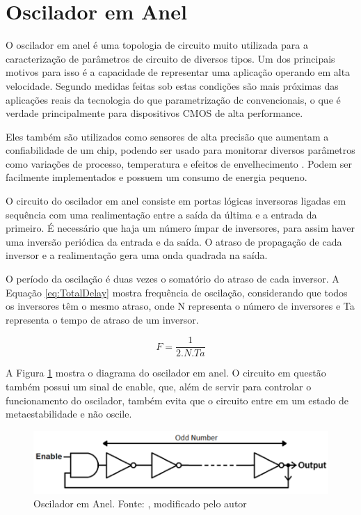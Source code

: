 \section{Oscilador em Anel}
O oscilador em anel é uma topologia de circuito muito utilizada para a caracterização de parâmetros de circuito de diversos tipos. Um dos principais motivos para isso é a capacidade de representar uma aplicação operando em alta velocidade. Segundo \cite{Bhushan} medidas feitas sob estas condições são mais próximas das aplicações reais da tecnologia do que parametrização dc convencionais, o que é verdade principalmente para dispositivos CMOS de alta performance.

Eles também são utilizados como sensores de alta precisão que aumentam a confiabilidade de um chip, podendo ser usado para monitorar diversos parâmetros como variações de processo, temperatura e efeitos de envelhecimento \cite{Sato}. Podem ser facilmente implementados e possuem um consumo de energia pequeno.

O circuito do oscilador em anel consiste em portas lógicas inversoras ligadas em sequência com uma realimentação entre a saída da última e a entrada da primeiro. É necessário que haja um número ímpar de inversores, para assim haver uma inversão periódica da entrada e da saída. O atraso de propagação de cada inversor e a realimentação gera uma onda quadrada na saída.

O período da oscilação é duas vezes o somatório do atraso de cada inversor. A Equação \ref{eq:TotalDelay} mostra frequência de oscilação, considerando que todos os inversores têm o mesmo atraso, onde N representa o número de inversores e Ta representa o tempo de atraso de um inversor.

\begin{equation}
    F = \frac{1}{2.N.Ta}
    \label{eq:TotalDelay}
\end{equation}
         
A Figura \ref{fig:RingOsc} mostra o diagrama do oscilador em anel. O circuito em questão também possui um sinal de enable, que, além de servir para controlar o funcionamento do oscilador, também evita que o circuito entre em um estado de metaestabilidade e não oscile.

\begin{figure}[H]
    \centering
    \includegraphics[width=\linewidth]{figures/RingOscModified.png}
    \caption{Oscilador em Anel. Fonte: \cite{Sparkfun}, modificado pelo autor}
    \label{fig:RingOsc}
\end{figure}

